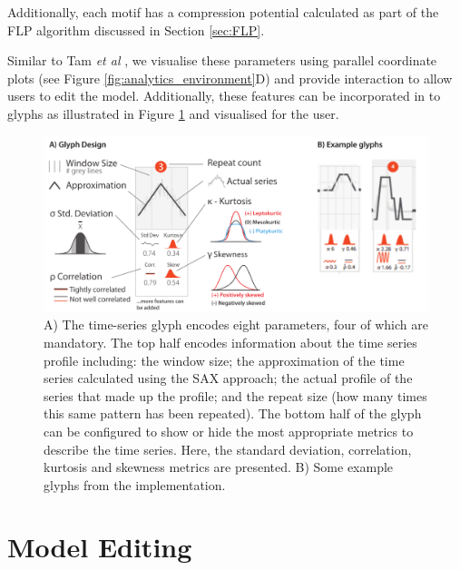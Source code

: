 Additionally, each motif has a compression potential calculated as part of the FLP algorithm discussed in Section \ref{sec:FLP}.

Similar to Tam \emph{et al} \cite{tam2011}, we visualise these parameters using parallel coordinate plots (see Figure \ref{fig:analytics_environment}D) and provide interaction to allow users to edit the model.
Additionally, these features can be incorporated in to glyphs as illustrated in Figure \ref{fig:glyph_design_features} and visualised for the user.

\begin{figure}[t!]
\centering
\includegraphics[width=\textwidth]{images/timeseries/glyphs_feature_space}
\caption{A) The time-series glyph encodes eight parameters, four of which are mandatory.
The top half encodes information about the time series profile including: the window size; the approximation of the time series calculated using the SAX approach; the actual profile of the series that made up the profile; and the repeat size (how many times this same pattern has been repeated). The bottom half of the glyph can be configured to show or hide the most appropriate metrics to describe the time series.
Here, the standard deviation, correlation, kurtosis and skewness metrics are presented. B) Some example glyphs from the implementation.}
\label{fig:glyph_design_features}
\end{figure}


\section{Model Editing}
\label{sec:model_editing}

